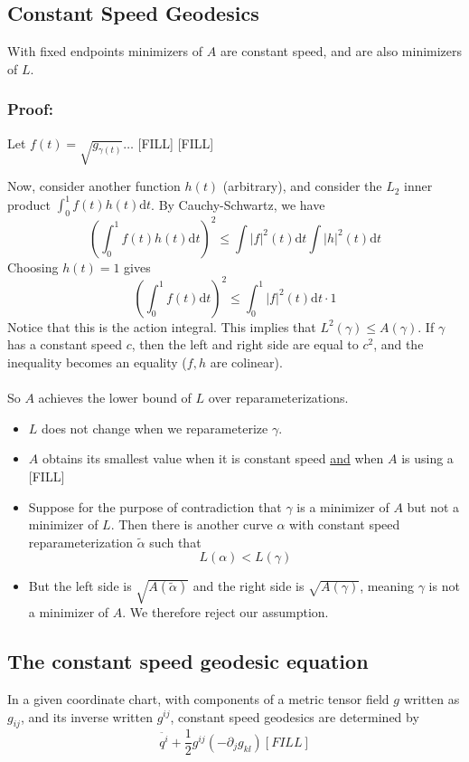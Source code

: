 \documentclass[10pt]{article}
\newcommand{\dd}{\text{d}}
\begin{document}
\subsection*{Constant Speed Geodesics}
With fixed endpoints minimizers of $A$ are constant speed, and are also minimizers of $L$.
\subsubsection*{Proof:}
Let $f(t) = \sqrt{g_{\gamma(t)}}\dots$ [FILL]
[FILL]

Now, consider another function $h(t)$ (arbitrary), and consider the $L_2$ inner product $\int_0^1 f(t) h(t) \dd t$.  By Cauchy-Schwartz, we have
\[\left(\int_0^1 f(t) h(t) \dd t\right)^2 \leq \int |f|^2(t) \dd t \int |h|^2 (t) \dd t\]
Choosing $h(t) = 1$ gives
\[\left(\int_0^1 f(t) \dd t\right)^2 \leq \int_0^1 |f|^2(t) \dd t \cdot 1\]
Notice that this is the action integral.  This implies that $L^2(\gamma) \leq A(\gamma)$.
If $\gamma$ has a constant speed $c$, then the left and right side are equal to $c^2$, and the inequality becomes an equality ($f, h$ are colinear).\\\\
So $A$ achieves the lower bound of $L$ over reparameterizations.
\begin{itemize}
	\item $L$ does not change when we reparameterize $\gamma$.
	\item $A$ obtains its smallest value when it is constant speed \underline{and} when $A$ is using a [FILL]
	\item Suppose for the purpose of contradiction that $\gamma$ is a minimizer of $A$ but not a minimizer of $L$.  Then there is another curve $\alpha$ with constant speed reparameterization $\tilde{\alpha}$ such that
	\[L(\alpha) < L(\gamma)\]
    \item But the left side is $\sqrt{A(\tilde{\alpha})}$ and the right side is $\sqrt{A(\gamma)}$, meaning $\gamma$ is not a minimizer of $A$.  We therefore reject our assumption.
\end{itemize}

\subsection*{The constant speed geodesic equation}
In a given coordinate chart, with components of a metric tensor field $g$ written as $g_{ij}$, and its inverse written $g^{ij}$, constant speed geodesics are determined by
\[\ddot{q^i} + \frac{1}{2} g^{ij} (-\partial_j g_{kl}) [FILL]\]
\end{document}
